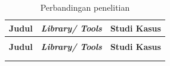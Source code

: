 \begin{longtable}{
		|p{}|
		p{}|
		p{}|}
	\caption{Perbandingan penelitian} \label{t_risetPemodelan} \\
	\hline
	\multicolumn{1}{|c|}{\textbf{Judul}} & 
	\multicolumn{1}{c|}{\textbf{\textit{Library/ Tools}}} & 
	\multicolumn{1}{c|}{\textbf{Studi Kasus}} \\ \hline
	\endfirsthead
	
	\multicolumn{3}{c}{} \\ \hline
	\multicolumn{1}{|c|}{\textbf{Judul}} & 
	\multicolumn{1}{c|}{\textbf{\textit{Library/ Tools}}} & 
	\multicolumn{1}{c|}{\textbf{Studi Kasus}} \\ \hline
	\endhead
	
	\hline \multicolumn{3}{r}{ } \\ 
	\endfoot
	
	\hline
	\endlastfoot
	

\end{longtable}
